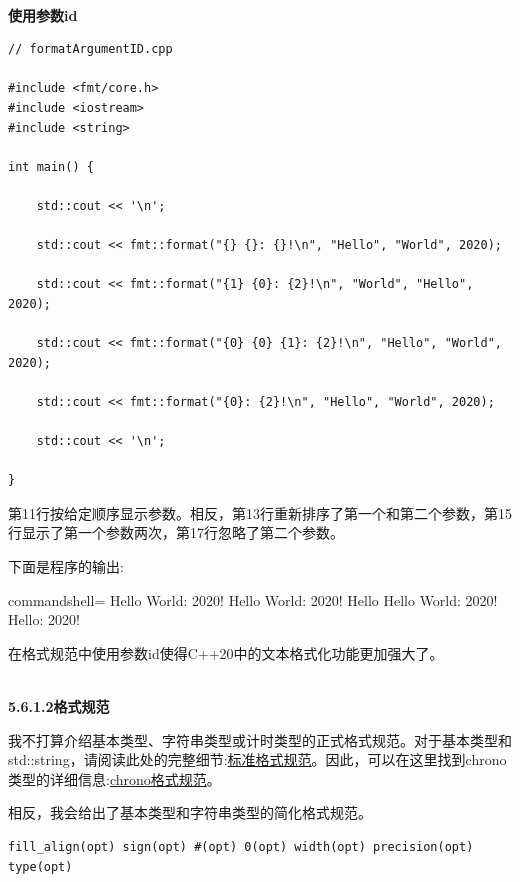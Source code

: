 \hspace*{\fill} \\ %
\noindent
\textbf{使用参数id}
\begin{lstlisting}[style=styleCXX]
// formatArgumentID.cpp

#include <fmt/core.h>
#include <iostream>
#include <string>

int main() {
	
	std::cout << '\n';
	
	std::cout << fmt::format("{} {}: {}!\n", "Hello", "World", 2020);
	
	std::cout << fmt::format("{1} {0}: {2}!\n", "World", "Hello", 2020);
	
	std::cout << fmt::format("{0} {0} {1}: {2}!\n", "Hello", "World", 2020);
	
	std::cout << fmt::format("{0}: {2}!\n", "Hello", "World", 2020);
	
	std::cout << '\n';

}
\end{lstlisting}

第11行按给定顺序显示参数。相反，第13行重新排序了第一个和第二个参数，第15行显示了第一个参数两次，第17行忽略了第二个参数。

下面是程序的输出:

\begin{tcblisting}{commandshell={}}
Hello World: 2020!
Hello World: 2020!
Hello Hello World: 2020!
Hello: 2020!
\end{tcblisting}

在格式规范中使用参数id使得C++20中的文本格式化功能更加强大了。

\hspace*{\fill} \\ %
\noindent
\textbf{5.6.1.2\hspace{0.2cm}格式规范}

我不打算介绍基本类型、字符串类型或计时类型的正式格式规范。对于基本类型和std::string，请阅读此处的完整细节:\href{https://en.cppreference.com/w/cpp/utility/format/formatter#Standard_format_specification}{标准格式规范}。因此，可以在这里找到chrono类型的详细信息:\href{https://en.cppreference.com/w/cpp/chrono/system_clock/formatter#Format_specification}{chrono格式规范}。

相反，我会给出了基本类型和字符串类型的简化格式规范。

\begin{lstlisting}[style=styleCXX]
fill_align(opt) sign(opt) #(opt) 0(opt) width(opt) precision(opt) type(opt)
\end{lstlisting}

